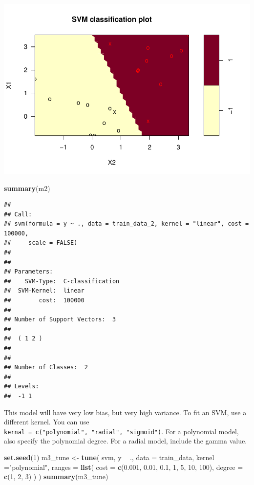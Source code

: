 \documentclass[
]{book}
\newenvironment{Shaded}{\begin{snugshade}}{\end{snugshade}}
\newcommand{\DataTypeTok}[1]{\textcolor[rgb]{0.13,0.29,0.53}{#1}}
\newcommand{\DecValTok}[1]{\textcolor[rgb]{0.00,0.00,0.81}{#1}}
\newcommand{\FloatTok}[1]{\textcolor[rgb]{0.00,0.00,0.81}{#1}}
\newcommand{\KeywordTok}[1]{\textcolor[rgb]{0.13,0.29,0.53}{\textbf{#1}}}
\newcommand{\NormalTok}[1]{#1}
\newcommand{\OperatorTok}[1]{\textcolor[rgb]{0.81,0.36,0.00}{\textbf{#1}}}
\newcommand{\StringTok}[1]{\textcolor[rgb]{0.31,0.60,0.02}{#1}}
\begin{document}
\includegraphics{data-sci_files/figure-latex/unnamed-chunk-137-1.pdf}

\begin{Shaded}
\begin{Highlighting}[]
\KeywordTok{summary}\NormalTok{(m2)}
\end{Highlighting}
\end{Shaded}

\begin{verbatim}
## 
## Call:
## svm(formula = y ~ ., data = train_data_2, kernel = "linear", cost = 100000, 
##     scale = FALSE)
## 
## 
## Parameters:
##    SVM-Type:  C-classification 
##  SVM-Kernel:  linear 
##        cost:  100000 
## 
## Number of Support Vectors:  3
## 
##  ( 1 2 )
## 
## 
## Number of Classes:  2 
## 
## Levels: 
##  -1 1
\end{verbatim}

This model will have very low bias, but very high variance. To fit an SVM, use a different kernel. You can use \texttt{kernal\ =\ c("polynomial",\ "radial",\ "sigmoid")}. For a polynomial model, also specify the polynomial degree. For a radial model, include the gamma value.

\begin{Shaded}
\begin{Highlighting}[]
\KeywordTok{set.seed}\NormalTok{(}\DecValTok{1}\NormalTok{)}
\NormalTok{m3_tune <-}\StringTok{ }\KeywordTok{tune}\NormalTok{(}
\NormalTok{  svm,}
\NormalTok{  y }\OperatorTok{~}\StringTok{ }\NormalTok{.,}
  \DataTypeTok{data =}\NormalTok{ train_data,}
  \DataTypeTok{kernel =}\StringTok{"polynomial"}\NormalTok{,}
  \DataTypeTok{ranges =} \KeywordTok{list}\NormalTok{(}
    \DataTypeTok{cost =} \KeywordTok{c}\NormalTok{(}\FloatTok{0.001}\NormalTok{, }\FloatTok{0.01}\NormalTok{, }\FloatTok{0.1}\NormalTok{, }\DecValTok{1}\NormalTok{, }\DecValTok{5}\NormalTok{, }\DecValTok{10}\NormalTok{, }\DecValTok{100}\NormalTok{),}
    \DataTypeTok{degree =} \KeywordTok{c}\NormalTok{(}\DecValTok{1}\NormalTok{, }\DecValTok{2}\NormalTok{, }\DecValTok{3}\NormalTok{)}
\NormalTok{  )}
\NormalTok{)}
\KeywordTok{summary}\NormalTok{(m3_tune)}
\end{Highlighting}
\end{Shaded}
\end{document}
